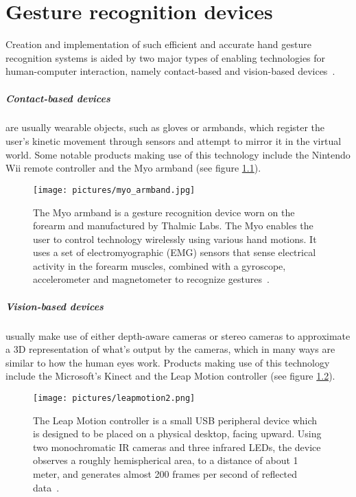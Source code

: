 \chapter{Gesture recognition devices}
Creation and implementation of such efficient and
accurate hand gesture recognition systems is aided by two major types of enabling
technologies for human-computer interaction, namely contact-based and vision-based devices~\citep{Rautaray2015}. 

\paragraph{Contact-based devices} are usually wearable objects, such as gloves or armbands, which register the user's kinetic movement through sensors and attempt to mirror it in the virtual world. Some notable products making use of this technology include the Nintendo Wii remote controller and the Myo armband (see figure \ref{fig:myo}). 

\begin{figure}%
	\texttt{[image: pictures/myo\_armband.jpg]}
	\caption{The Myo armband is a gesture recognition device worn on the forearm and manufactured by Thalmic Labs. The Myo enables the user to control technology wirelessly using various hand motions. It uses a set of electromyographic (EMG) sensors that sense electrical activity in the forearm muscles, combined with a gyroscope, accelerometer and magnetometer to recognize gestures~\citep{Myo2015}.}
	\label{fig:myo}
\end{figure}

\paragraph{Vision-based devices} usually make use of either depth-aware cameras or stereo cameras to approximate a 3D representation of what's output by the cameras, which in many ways are similar to how the human eyes work. Products making use of this technology include the Microsoft's Kinect and the Leap Motion controller (see figure \ref{fig:leapmotion}). 

\begin{figure}%
	\texttt{[image: pictures/leapmotion2.png]}
	\caption{The Leap Motion controller is a small USB peripheral device which is designed to be placed on a physical desktop, facing upward. Using two monochromatic IR cameras and three infrared LEDs, the device observes a roughly hemispherical area, to a distance of about 1 meter, and generates almost 200 frames per second of reflected data~\citep{LeapMotion2016}.}
	\label{fig:leapmotion}
\end{figure} 

